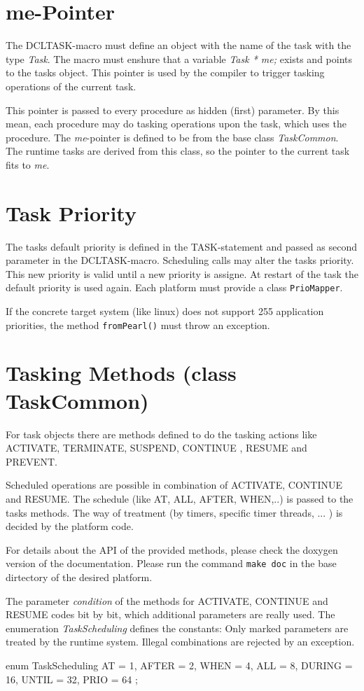 \section{me-Pointer}
The DCLTASK-macro must define an object with the name of the
task with the type {\em Task}.
The macro must enshure that a variable  {\em Task * me;} exists
and points to the tasks object. This pointer is used
by the compiler to trigger tasking operations of the current
task.

This pointer is passed to every procedure as hidden (first) parameter.
By this mean, each procedure may do tasking operations upon the
task, which uses the procedure.
The {\em me}-pointer is defined to be from the base class  {\em TaskCommon}. 
The runtime tasks are derived from this class, so the pointer to the current 
task fits to {\em me}.

\section{Task Priority}
The tasks default priority is defined in the TASK-statement and passed
as second parameter in the DCLTASK-macro.
Scheduling calls may alter the tasks priority. This new priority is valid 
until a new priority is assigne. At restart of the task the default 
priority is used again. Each platform must provide a class \verb|PrioMapper|.

If the concrete target system (like linux) does not support 255 
 application priorities, the method \verb|fromPearl()| must throw
an exception.

\section{Tasking Methods (class TaskCommon)}
For task objects there are methods defined to do the tasking actions like
ACTIVATE, TERMINATE, SUSPEND, CONTINUE , RESUME and PREVENT.

Scheduled operations are possible in combination of ACTIVATE, 
CONTINUE and RESUME.
The schedule (like AT, ALL, AFTER, WHEN,..) is passed to the 
tasks methods. The way of treatment (by timers, specific timer threads, ... )
is decided by the platform code.

For details about the API of the provided methods, please check the doxygen 
version of the documentation.
Please run  the command \verb|make doc| in the base dirtectory of the
desired platform.

The parameter {\em condition} of the methods for ACTIVATE, CONTINUE and RESUME
codes bit by bit, which additional parameters are really used.
The enumeration {\em TaskScheduling} defines the constants:
Only marked parameters are treated by the runtime system.
Illegal combinations are rejected by an exception.
\begin{CppCode}
      enum TaskScheduling {
         AT = 1, AFTER = 2, WHEN = 4, ALL = 8,
         DURING = 16, UNTIL = 32, PRIO = 64
      };
\end{CppCode}

